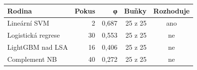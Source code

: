 \begin{tabular}{lrrrc}
\toprule
Rodina & Pokus & φ & Buňky & Rozhoduje\\
\midrule
Lineární SVM & 2 & 0,687 & 25 z 25 & ano\\
Logistická regrese & 30 & 0,553 & 25 z 25 & ne\\
LightGBM nad LSA & 16 & 0,406 & 25 z 25 & ne\\
Complement NB & 40 & 0,272 & 25 z 25 & ne\\
\bottomrule
\end{tabular}
